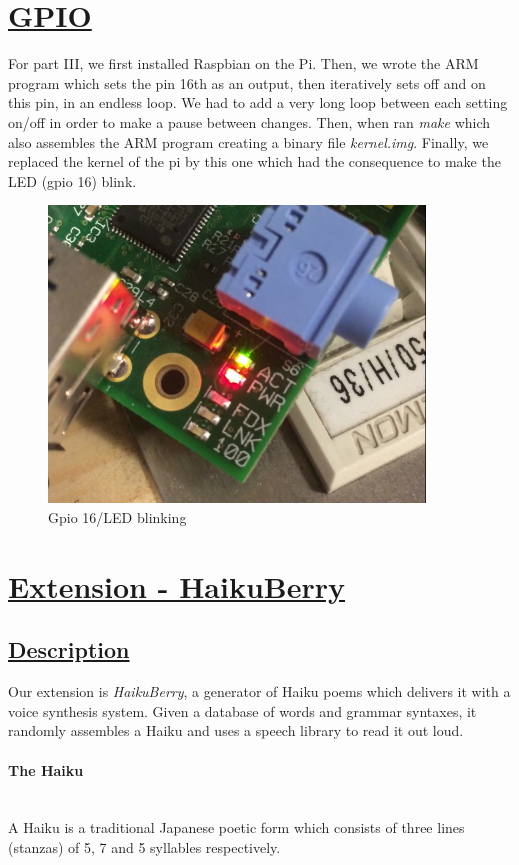 \documentclass[10pt]{article}
\begin{document}
\section{\underline{GPIO}}
For part III, we first installed Raspbian on the Pi. Then, we wrote the ARM program which sets the pin 16th as an output, then iteratively sets off and on this pin, in an endless loop. We had to add a very long loop between each setting on/off in order to make a pause between changes. Then, when ran \textit{make} which also assembles the ARM program creating a binary file \textit{kernel.img}. Finally, we replaced the kernel of the pi by this one which had the consequence to make the LED (gpio 16) blink.
\begin{figure}[h!]
\centering
\includegraphics[width=10cm]{IMG_B28F30CC1D47-1}
\caption{Gpio 16/LED blinking}
\end{figure}
\bigskip
\bigskip

\section{\underline{Extension - HaikuBerry}}

\subsection{\underline{Description}}
Our extension is \textit{HaikuBerry}, a generator of Haiku poems which delivers it with a voice synthesis system. Given a database of words and grammar syntaxes, it randomly assembles a Haiku and uses a speech library to read it out loud.
\paragraph{The Haiku}\mbox{}\\
A Haiku is a traditional Japanese poetic form which consists of three lines (stanzas) of 5, 7 and 5 syllables respectively.
\end{document}
